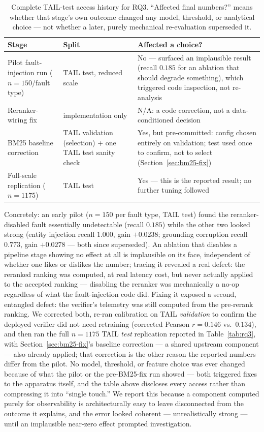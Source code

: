 \documentclass[conference]{IEEEtran}
\begin{document}
\begin{table}[t]
\caption{Complete TAIL-test access history for RQ3. ``Affected final numbers?'' means whether that stage's own outcome changed any model, threshold, or analytical choice --- not whether a later, purely mechanical re-evaluation superseded it.}
\label{tab:chronology}
\centering
\scriptsize
\begin{tabular}{p{1.85cm}p{1.6cm}p{4.15cm}}
\toprule
Stage & Split & Affected a choice? \\
\midrule
Pilot fault-injection run ($n{=}150$/fault type) & TAIL test, reduced scale & No --- surfaced an implausible result (recall $0.185$ for an ablation that should degrade something), which triggered code inspection, not re-analysis \\
Reranker-wiring fix & implementation only & N/A: a code correction, not a data-conditioned decision \\
BM25 baseline correction & TAIL validation (selection) + one TAIL test sanity check & Yes, but pre-committed: config chosen entirely on validation; test used once to confirm, not to select (Section~\ref{sec:bm25-fix}) \\
Full-scale replication ($n{=}1175$) & TAIL test & Yes --- this is the reported result; no further tuning followed \\
\bottomrule
\end{tabular}
\end{table}

Concretely: an early pilot ($n{=}150$ per fault type, TAIL test) found
the reranker-disabled fault essentially undetectable (recall $0.185$)
while the other two looked strong (entity injection recall $1.000$,
gain $+0.0238$; grounding corruption recall $0.773$, gain $+0.0278$
--- both since superseded). An ablation that disables a pipeline stage
showing no effect at all is implausible on its face, independent of
whether one likes or dislikes the number; tracing it revealed a real
defect: the reranked ranking was computed, at real latency cost, but
never actually applied to the accepted ranking --- disabling the
reranker was mechanically a no-op regardless of what the
fault-injection code did. Fixing it exposed a second, entangled
defect: the verifier's telemetry was still computed from the
pre-rerank ranking. We corrected both, re-ran calibration on TAIL
\emph{validation} to confirm the deployed verifier did not need
retraining (corrected Pearson $r=0.146$ vs.\ $0.134$), and then ran the
full $n{=}1175$ TAIL \emph{test} replication reported in
Table~\ref{tab:rq3}, with Section~\ref{sec:bm25-fix}'s baseline
correction --- a shared upstream component --- also already applied;
that correction is the other reason the reported numbers differ from
the pilot. No model, threshold, or feature choice was ever changed
because of what the pilot or the pre-BM25-fix run showed --- both
triggered fixes to the apparatus itself, and the table above discloses
every access rather than compressing it into ``single touch.'' We
report this because a component computed purely for observability is
architecturally easy to leave disconnected from the outcome it
explains, and the error looked coherent --- unrealistically strong ---
until an implausible near-zero effect prompted investigation.
\end{document}

